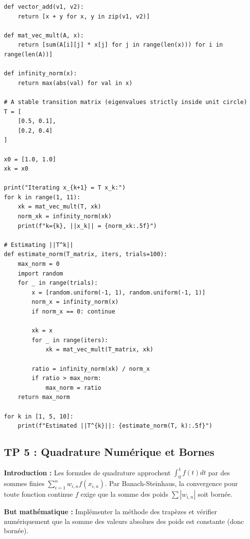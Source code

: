 \documentclass[11pt,a4paper]{article}
\begin{document}
\begin{lstlisting}
def vector_add(v1, v2):
    return [x + y for x, y in zip(v1, v2)]

def mat_vec_mult(A, x):
    return [sum(A[i][j] * x[j] for j in range(len(x))) for i in range(len(A))]

def infinity_norm(x):
    return max(abs(val) for val in x)

# A stable transition matrix (eigenvalues strictly inside unit circle)
T = [
    [0.5, 0.1],
    [0.2, 0.4]
]

x0 = [1.0, 1.0]
xk = x0

print("Iterating x_{k+1} = T x_k:")
for k in range(1, 11):
    xk = mat_vec_mult(T, xk)
    norm_xk = infinity_norm(xk)
    print(f"k={k}, ||x_k|| = {norm_xk:.5f}")

# Estimating ||T^k||
def estimate_norm(T_matrix, iters, trials=100):
    max_norm = 0
    import random
    for _ in range(trials):
        x = [random.uniform(-1, 1), random.uniform(-1, 1)]
        norm_x = infinity_norm(x)
        if norm_x == 0: continue

        xk = x
        for _ in range(iters):
            xk = mat_vec_mult(T_matrix, xk)

        ratio = infinity_norm(xk) / norm_x
        if ratio > max_norm:
            max_norm = ratio
    return max_norm

for k in [1, 5, 10]:
    print(f"Estimated ||T^{k}||: {estimate_norm(T, k):.5f}")
\end{lstlisting}
\vspace{1cm}
\subsection*{TP 5 : Quadrature Numérique et Bornes}
\textbf{Introduction :}
Les formules de quadrature approchent $\int_0^1 f(t) dt$ par des sommes finies $\sum_{i=1}^n w_{i,n} f(x_{i,n})$. Par Banach-Steinhaus, la convergence pour toute fonction continue $f$ exige que la somme des poids $\sum |w_{i,n}|$ soit bornée.

\textbf{But mathématique :}
Implémenter la méthode des trapèzes et vérifier numériquement que la somme des valeurs absolues des poids est constante (donc bornée).
\end{document}
